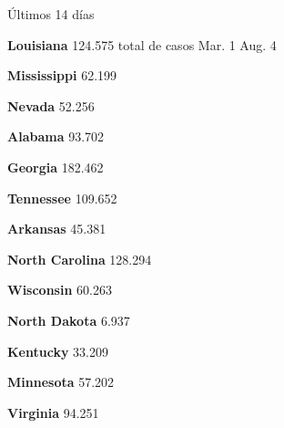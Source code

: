 Últimos 14 días

\textbf{Louisiana} 124.575 total de casos Mar. 1 Aug. 4

\href{https://www.nytimes3xbfgragh.onion/interactive/2020/us/mississippi-coronavirus-cases.html}{}

\textbf{Mississippi} 62.199

\href{https://www.nytimes3xbfgragh.onion/interactive/2020/us/nevada-coronavirus-cases.html}{}

\textbf{Nevada} 52.256

\href{https://www.nytimes3xbfgragh.onion/interactive/2020/us/alabama-coronavirus-cases.html}{}

\textbf{Alabama} 93.702

\href{https://www.nytimes3xbfgragh.onion/interactive/2020/us/georgia-coronavirus-cases.html}{}

\textbf{Georgia} 182.462

\href{https://www.nytimes3xbfgragh.onion/interactive/2020/us/tennessee-coronavirus-cases.html}{}

\textbf{Tennessee} 109.652

\href{https://www.nytimes3xbfgragh.onion/interactive/2020/us/arkansas-coronavirus-cases.html}{}

\textbf{Arkansas} 45.381

\href{https://www.nytimes3xbfgragh.onion/interactive/2020/us/north-carolina-coronavirus-cases.html}{}

\textbf{North Carolina} 128.294

\href{https://www.nytimes3xbfgragh.onion/interactive/2020/us/wisconsin-coronavirus-cases.html}{}

\textbf{Wisconsin} 60.263

\href{https://www.nytimes3xbfgragh.onion/interactive/2020/us/north-dakota-coronavirus-cases.html}{}

\textbf{North Dakota} 6.937

\href{https://www.nytimes3xbfgragh.onion/interactive/2020/us/kentucky-coronavirus-cases.html}{}

\textbf{Kentucky} 33.209

\href{https://www.nytimes3xbfgragh.onion/interactive/2020/us/minnesota-coronavirus-cases.html}{}

\textbf{Minnesota} 57.202

\href{https://www.nytimes3xbfgragh.onion/interactive/2020/us/virginia-coronavirus-cases.html}{}

\textbf{Virginia} 94.251

